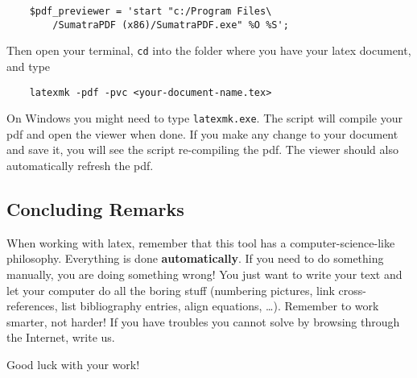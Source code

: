 \documentclass[conference]{IEEEtran}
\begin{document}
{\footnotesize
\begin{verbatim}
	$pdf_previewer = 'start "c:/Program Files\
	    /SumatraPDF (x86)/SumatraPDF.exe" %O %S';
\end{verbatim}
}

Then open your terminal, \verb|cd| into the folder where you have your latex document, and type

{\footnotesize
\begin{verbatim}
	latexmk -pdf -pvc <your-document-name.tex>
\end{verbatim}
}

On Windows you might need to type \verb|latexmk.exe|.
The script will compile your pdf and open the viewer when done.
If you make any change to your document and save it, you will see the script re-compiling the pdf.
The viewer should also automatically refresh the pdf.

\subsection{Concluding Remarks}

When working with latex, remember that this tool has a computer-science-like philosophy.
Everything is done \textbf{automatically}.
If you need to do something manually, you are doing something wrong!
You just want to write your text and let your computer do all the boring stuff (numbering pictures, link cross-references, list bibliography entries, align equations, \dots).
Remember to work smarter, not harder!
If you have troubles you cannot solve by browsing through the Internet, write us.

Good luck with your work!
\end{document}
